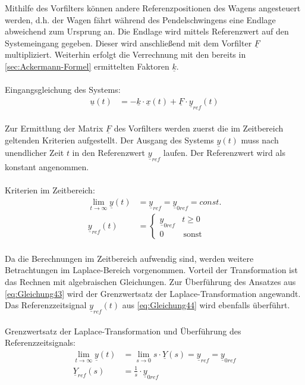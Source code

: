\documentclass[
	pagesize,
	fontsize=12pt,
	paper=a4,
	oneside,
   reqno
]{scrartcl}
\begin{document}
Mithilfe des Vorfilters können andere Referenzpositionen des Wagens angesteuert werden, d.h. der Wagen fährt während des Pendelschwingens eine Endlage abweichend zum Ursprung an. Die Endlage wird mittels Referenzwert auf den Systemeingang gegeben. Dieser wird anschließend mit dem Vorfilter $\underline{F}$ multipliziert. Weiterhin erfolgt die Verrechnung mit den bereits in \autoref{sec:Ackermann-Formel} ermittelten Faktoren $\underline{k}$.\\\\
Eingangsgleichung des Systems:
\begin{align}\label{eq:Gleichung42}
    \underline{u}(t) &= -\underline{k}\cdot\underline{x}(t)+\underline{F}\cdot\underline{y}_{ref}(t)
\end{align}\\
Zur Ermittlung der Matrix $\underline{F}$ des Vorfilters werden zuerst die im Zeitbereich geltenden Kriterien aufgestellt. Der Ausgang des Systems $\underline{y}(t)$ muss nach unendlicher Zeit $t$ in den Referenzwert $\underline{y}_{ref}$ laufen. Der Referenzwert wird als konstant angenommen.\\\\
Kriterien im Zeitbereich:
\begin{align}
    \lim_{t \to \infty} \underline{y}(t) &= \underline{y}_{ref} = \underline{y}_{0ref} = const. \label{eq:Gleichung43}\\
    \underline{y}_{ref}(t) &=
    \begin{cases}
        \underline{y}_{0ref} & t \geq 0 \\
        0 & \, \text{sonst}
    \end{cases} \label{eq:Gleichung44}
\end{align}\\
Da die Berechnungen im Zeitbereich aufwendig sind, werden weitere Betrachtungen im Laplace-Bereich vorgenommen. Vorteil der Transformation ist das Rechnen mit algebraischen Gleichungen. Zur Überführung des Ansatzes aus \autoref{eq:Gleichung43} wird der Grenzwertsatz der Laplace-Transformation angewandt. Das Referenzzeitsignal $\underline{y}_{ref}(t)$ aus \autoref{eq:Gleichung44} wird ebenfalls überführt.\\\\
Grenzwertsatz der Laplace-Transformation und Überführung des Referenzzeitsignals:
\begin{align}
    \lim_{t \to \infty} \underline{y}(t) &= \lim_{s \to 0} s\cdot\underline{Y}(s) = \underline{y}_{ref} = \underline{y}_{0ref} \label{eq:Gleichung45}\\
    \underline{Y}_{ref}(s) &= \frac{1}{s}\cdot\underline{y}_{0ref} \label{eq:Gleichung46}
\end{align}\\
\end{document}
